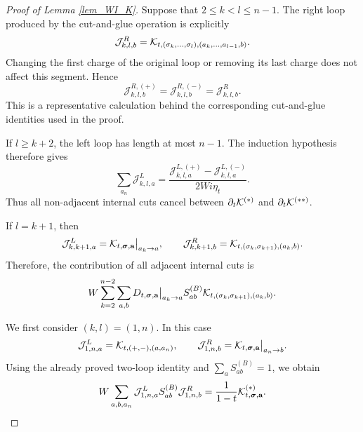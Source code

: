 \documentclass[10pt,reqno]{article}
\theoremstyle{plain} %
\theoremstyle{remark}
\numberwithin{equation}{section}
\begin{document}
\begin{proof}[Proof of Lemma \ref{lem_WI_K}]
\medskip
{}

Suppose that $2\leq k<l\leq n-1$. The right loop produced by the
cut-and-glue operation is explicitly
\[
 \mathcal J^R_{k,l,b}
 ={\cal K}_{t,(\sigma_k,\ldots,\sigma_l),
 (a_k,\ldots,a_{l-1},b)}.
\]
Changing the first charge of the original loop or removing its last charge
does not affect this segment. Hence
\begin{equation}\label{kdjuwsz}
 \mathcal J^{R,(+)}_{k,l,b}
 =\mathcal J^{R,(-)}_{k,l,b}
 =\mathcal J^R_{k,l,b}.
\end{equation}
This is a representative calculation behind the corresponding
cut-and-glue identities used in the proof.

If $l\geq k+2$, the left loop has length at most $n-1$. The induction
hypothesis therefore gives
\begin{equation}\label{a';slw}
 \sum_{a_n}\mathcal J^L_{k,l,a}
 =\frac{\mathcal J^{L,(+)}_{k,l,a}
 -\mathcal J^{L,(-)}_{k,l,a}}{2Wi\eta_t}.
\end{equation}
Thus all non-adjacent internal cuts cancel between
$\partial_t{\cal K}^{(*)}$ and $\partial_t{\cal K}^{(**)}$.

If $l=k+1$, then
\begin{equation}\label{uaiw03}
\begin{aligned}
 \mathcal J^L_{k,k+1,a}
 ={\cal K}_{t,\boldsymbol{\sigma},\textbf{a}}\big|_{a_k\to a},
 \qquad
 \mathcal J^R_{k,k+1,b}
 ={\cal K}_{t,(\sigma_k,\sigma_{k+1}),(a_k,b)}.
\end{aligned}
\end{equation}
Therefore, the contribution of all adjacent internal cuts is
\begin{equation}\label{WI-pr-Mid}
 W\sum_{k=2}^{n-2}\sum_{a,b}
 D_{t,\boldsymbol{\sigma},\textbf{a}}\big|_{a_k\to a}
 S^{(B)}_{ab}{\cal K}_{t,(\sigma_k,\sigma_{k+1}),(a_k,b)}.
\end{equation}

\medskip
{}

We first consider $(k,l)=(1,n)$. In this case
\[
 \mathcal J^L_{1,n,a}={\cal K}_{t,(+,-),(a,a_n)},
 \qquad
 \mathcal J^R_{1,n,b}
 ={\cal K}_{t,\boldsymbol{\sigma},\textbf{a}}\big|_{a_n\to b}.
\]
Using the already proved two-loop identity and
$\sum_aS^{(B)}_{ab}=1$, we obtain
\begin{equation}\label{nssfku}
 W\sum_{a,b,a_n}
 \mathcal J^L_{1,n,a}S^{(B)}_{ab}\mathcal J^R_{1,n,b}
 =\frac{1}{1-t}{\cal K}^{(*)}_{t,\boldsymbol{\sigma},\textbf{a}}.
\end{equation}


\end{proof}
\end{document}
